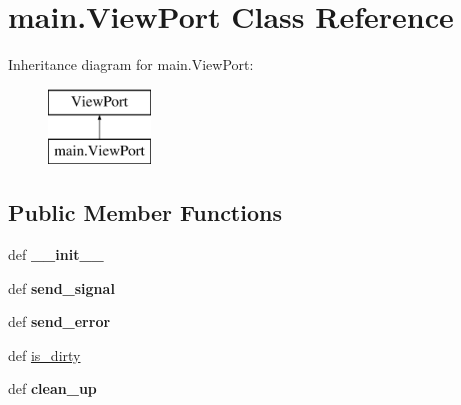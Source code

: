 \hypertarget{classmain_1_1ViewPort}{\section{main.\-View\-Port Class Reference}
\label{classmain_1_1ViewPort}
}
Inheritance diagram for main.\-View\-Port\-:\begin{figure}[H]
\begin{center}
\leavevmode
\includegraphics[height=2.000000cm]{classmain_1_1ViewPort}
\end{center}
\end{figure}
\subsection*{Public Member Functions}
\begin{DoxyCompactItemize}
\item 
\hypertarget{classmain_1_1ViewPort_ac5daf01cc84f0883a66c2ec10c33d79c}{def {\bfseries \-\_\-\-\_\-init\-\_\-\-\_\-}}\label{classmain_1_1ViewPort_ac5daf01cc84f0883a66c2ec10c33d79c}

\item 
\hypertarget{classmain_1_1ViewPort_adb11a14a14b2f6e094f714c14b7a58db}{def {\bfseries send\-\_\-signal}}\label{classmain_1_1ViewPort_adb11a14a14b2f6e094f714c14b7a58db}

\item 
\hypertarget{classmain_1_1ViewPort_af36f4fe1b2939d856da39d374ffbf9db}{def {\bfseries send\-\_\-error}}\label{classmain_1_1ViewPort_af36f4fe1b2939d856da39d374ffbf9db}

\item 
def \hyperlink{classmain_1_1ViewPort_a5652106d953c961d92bf96b32e4130b0}{is\-\_\-dirty}
\item 
\hypertarget{classmain_1_1ViewPort_a52a551b8a04099982f77b590289202b3}{def {\bfseries clean\-\_\-up}}\label{classmain_1_1ViewPort_a52a551b8a04099982f77b590289202b3}

\end{DoxyCompactItemize}
